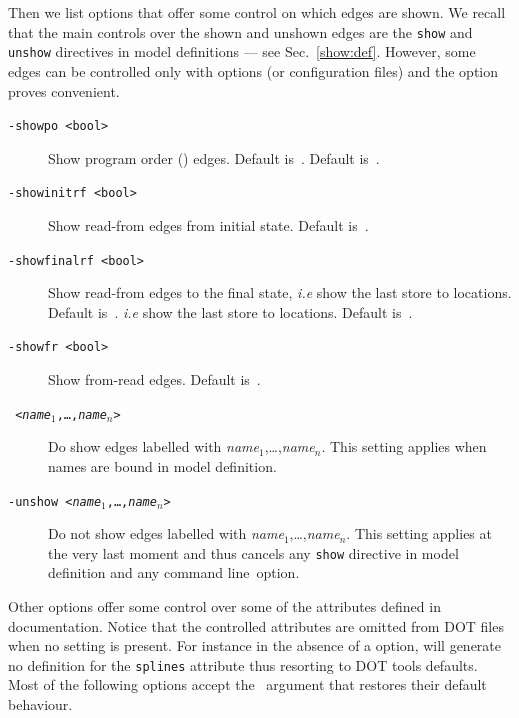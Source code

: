 Then we list options that offer some control on which edges are shown.
We recall that the main controls over the shown and unshown edges are
the \verb+show+ and \verb+unshow+ directives in model definitions ---
see Sec.~\ref{show:def}.
However, some edges can be controlled only with options (or configuration
files) and the  option proves convenient.
\begin{description}
\item[{\tt -showpo <bool>}] Show program order () edges.
Default is~.
Default is~.
\item[{\tt -showinitrf <bool>}] Show read-from edges from initial state.
Default is~.
\item[{\tt -showfinalrf <bool>}] Show read-from edges to the final state,
\emph{i.e} show the last store to locations. Default is~.
\emph{i.e} show the last store to locations. Default is~.
\item[{\tt -showfr <bool>}] Show from-read edges. Default is~.
\item[{\tt {} <\textit{name}$_1$,\ldots,\textit{name}$_n$>}]
Do show edges labelled with \textit{name}$_1$,\ldots,\textit{name}$_n$.
This setting applies when names are bound in model definition.
\item[{\tt -unshow <\textit{name}$_1$,\ldots,\textit{name}$_n$>}]
Do not show edges labelled with \textit{name}$_1$,\ldots,\textit{name}$_n$.
This setting applies at the very last moment and thus cancels any
\verb+show+ directive in model definition and any  command
line~option.
\end{description}
Other options offer some control over some of the attributes defined in
 documentation.
Notice that the controlled attributes are omitted from DOT files
when no setting is present.
For instance in the absence of a  option, \herd{}
will generate no definition for the \texttt{splines} attribute thus
resorting to DOT tools defaults.
Most of the following
options accept the ~argument that restores their
default behaviour.
